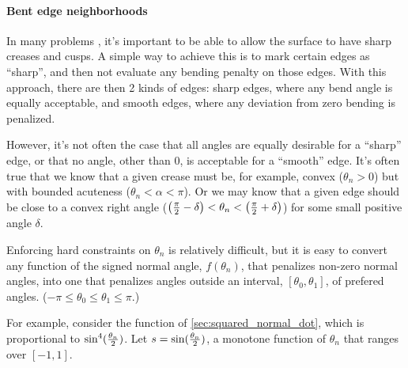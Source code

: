 
\paragraph{Bent edge neighborhoods}
\label{sec:Bent-edge-neighborhoods}

In many problems \cite{HoppeEtal:1994:SIGGRAPH,Hoppe:1994:Phd},
it's important to be able to allow the surface to have
sharp creases and cusps.
A simple way to achieve this is to mark
certain edges as ``sharp'',
and then not evaluate any bending penalty
on those edges.
With this approach, there are then 2 kinds of edges:
sharp edges, where any bend angle is equally acceptable,
and smooth edges, 
where any deviation from zero bending is penalized.

However, it's not often the case that all angles
are equally desirable for a ``sharp'' edge,
or that no angle, other than $0$, is acceptable
for a ``smooth'' edge.
It's often true that we know that a given crease
must be, for example, convex ($\theta_n > 0$)
but with bounded acuteness ($\theta_n < \alpha < \pi$).
Or we may know that a given edge should be close to
a convex right angle 
($\left( {\pi \over 2} - \delta \right) 
< \theta_n < 
\left( {\pi \over 2} + \delta \right)$)
for some small positive angle $\delta$.

Enforcing hard constraints on $\theta_n$
is relatively difficult,
but it is easy to convert any function
of the signed normal angle, $f(\theta_n)$,
that penalizes non-zero normal angles,
into one that penalizes angles 
outside an interval, $\left[\theta_0,\theta_1\right]$,
of prefered angles.
($-\pi \leq \theta_0 \leq \theta_1 \leq \pi$.)

For example,
consider the function of \autoref{sec:squared_normal_dot},
which is proportional to $\sin^4({\theta_n \over 2})$. 
Let $s = \sin({\theta_n \over 2})$,
a monotone function of $\theta_n$ 
that ranges over $\left[ -1, 1 \right]$.

